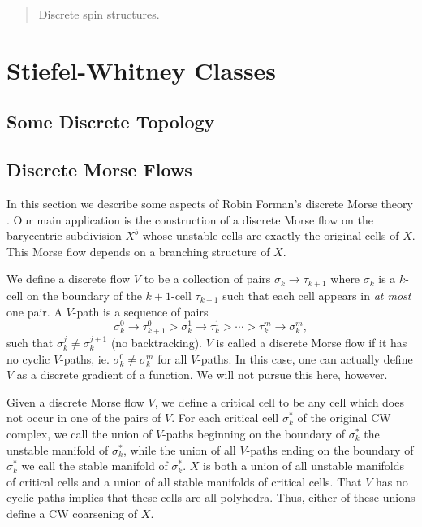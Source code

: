 \documentclass{article}
\theoremstyle{definition}
\begin{document}

\begin{abstract}
Discrete spin structures.

\noindent



\end{abstract}


\section{Stiefel-Whitney Classes}

\subsection{Some Discrete Topology}

\subsection{Discrete Morse Flows}

In this section we describe some aspects of Robin Forman's discrete Morse theory \cite{FORMAN199890}. Our main application is the construction of a discrete Morse flow on the barycentric subdivision $X^b$ whose unstable cells are exactly the original cells of $X$. This Morse flow depends on a branching structure of $X$.

We define a discrete flow $V$ to be a collection of pairs $\sigma_k \to \tau_{k+1}$ where $\sigma_k$ is a $k$-cell on the boundary of the $k+1$-cell $\tau_{k+1}$ such that each cell appears in \textit{at most} one pair. A $V$-path is a sequence of pairs
\[\sigma_k^0 \to \tau_{k+1}^0 > \sigma_k^1 \to \tau_k^1 > \cdots > \tau_k^m \to \sigma_k^m,\]
such that $\sigma_k^j \neq \sigma_k^{j+1}$ (no backtracking). $V$ is called a discrete Morse flow if it has no cyclic $V$-paths, ie. $\sigma^0_k \neq \sigma^m_k$ for all $V$-paths. In this case, one can actually define $V$ as a discrete gradient of a function. We will not pursue this here, however.

Given a discrete Morse flow $V$, we define a critical cell to be any cell which does not occur in one of the pairs of $V$. For each critical cell $\sigma^*_k$ of the original CW complex, we call the union of $V$-paths beginning on the boundary of $\sigma^*_k$ the unstable manifold of $\sigma^*_k$, while the union of all $V$-paths ending on the boundary of $\sigma^*_k$ we call the stable manifold of $\sigma^*_k$. $X$ is both a union of all unstable manifolds of critical cells and a union of all stable manifolds of critical cells. That $V$ has no cyclic paths implies that these cells are all polyhedra. Thus, either of these unions define a CW coarsening of $X$.
\end{document}
